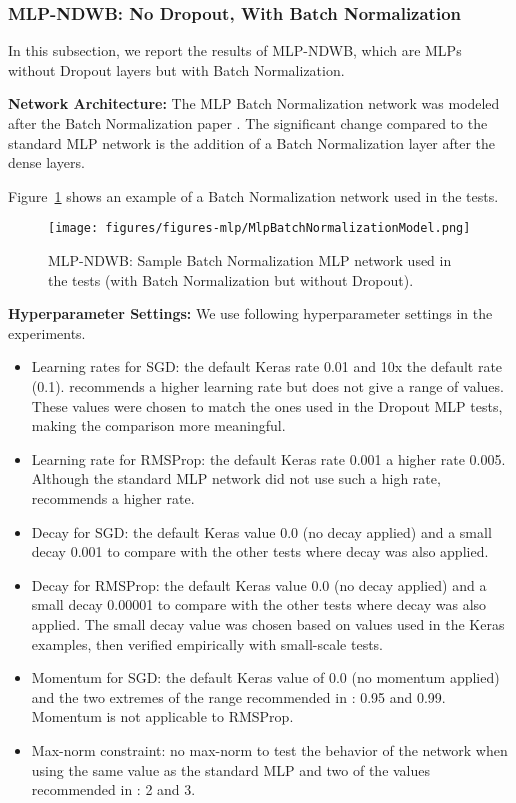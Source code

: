 \documentclass[../dropout-vs-batch-normalization.tex]{subfiles}
\begin{document}

\medskip
\subsubsection{MLP-NDWB: No Dropout, With Batch Normalization}
In this subsection, we report the results of MLP-NDWB, which are MLPs without Dropout layers but with Batch Normalization.


\smallskip
\noindent\textbf{Network Architecture:} The MLP Batch Normalization network was modeled after the Batch Normalization paper \cite{Ioffe2015}. The significant change compared to the standard MLP network is the addition of a Batch Normalization layer after the dense layers.

Figure~\ref{fig:MlpBatchNormalizationModel} shows an example of a Batch Normalization network used in the tests.

\begin{figure}
\centerline{\texttt{[image: figures/figures-mlp/MlpBatchNormalizationModel.png]}}
\caption{MLP-NDWB: Sample Batch Normalization MLP network used in the tests (with Batch Normalization but without Dropout).}
\label{fig:MlpBatchNormalizationModel}
\end{figure}

\medskip
\noindent\textbf{Hyperparameter Settings:} We use following hyperparameter settings in the experiments.

\begin{itemize}
\item Learning rates for SGD: the default Keras rate 0.01 and 10x the default rate (0.1). \cite{Ioffe2015} recommends a higher learning rate but does not give a range of values. These values were chosen to match the ones used in the Dropout MLP tests, making the comparison more meaningful.
\item Learning rate for RMSProp: the default Keras rate 0.001 a higher rate 0.005. Although the standard MLP network did not use such a high rate, \cite{Ioffe2015} recommends a higher rate.
\item Decay for SGD: the default Keras value 0.0 (no decay applied) and a small decay 0.001 to compare with the other tests where decay was also applied.
\item Decay for RMSProp: the default Keras value 0.0 (no decay applied) and a small decay 0.00001 to compare with the other tests where decay was also applied. The small decay value was chosen based on values used in the Keras examples, then verified empirically with small-scale tests.
\item Momentum for SGD: the default Keras value of 0.0 (no momentum applied) and the two extremes of the range recommended in \cite{Srivastava2014}: 0.95 and 0.99.  Momentum is not applicable to RMSProp.
\item Max-norm constraint: no max-norm to test the behavior of the network when using the same value as the standard MLP and two of the values recommended in \cite{Srivastava2014}: 2 and 3.
\end{itemize}
\end{document}
